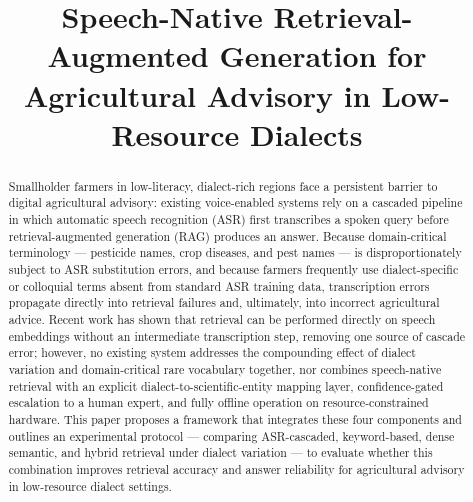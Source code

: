 \documentclass[conference]{IEEEtran}
\begin{document}
\raggedbottom

\title{Speech-Native Retrieval-Augmented Generation for Agricultural Advisory in Low-Resource Dialects \\
}

\author{

}

\maketitle

\begin{abstract}
Smallholder farmers in low-literacy, dialect-rich regions face a persistent barrier to digital agricultural advisory: existing voice-enabled systems rely on a cascaded pipeline in which automatic speech recognition (ASR) first transcribes a spoken query before retrieval-augmented generation (RAG) produces an answer. Because domain-critical terminology — pesticide names, crop diseases, and pest names — is disproportionately subject to ASR substitution errors, and because farmers frequently use dialect-specific or colloquial terms absent from standard ASR training data, transcription errors propagate directly into retrieval failures and, ultimately, into incorrect agricultural advice. Recent work has shown that retrieval can be performed directly on speech embeddings without an intermediate transcription step, removing one source of cascade error; however, no existing system addresses the compounding effect of dialect variation and domain-critical rare vocabulary together, nor combines speech-native retrieval with an explicit dialect-to-scientific-entity mapping layer, confidence-gated escalation to a human expert, and fully offline operation on resource-constrained hardware. This paper proposes a framework that integrates these four components and outlines an experimental protocol — comparing ASR-cascaded, keyword-based, dense semantic, and hybrid retrieval under dialect variation — to evaluate whether this combination improves retrieval accuracy and answer reliability for agricultural advisory in low-resource dialect settings.
\end{abstract}
\end{document}
